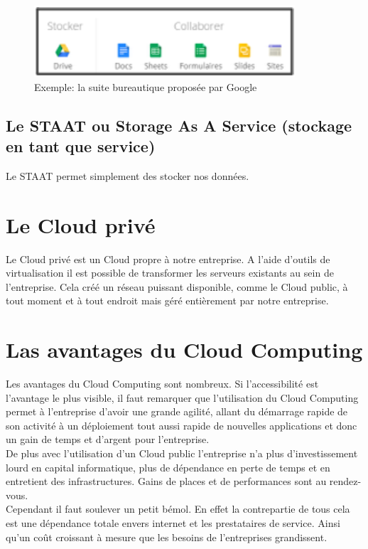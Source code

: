     \begin{figure}
      \begin{center}
        \includegraphics[scale=1]{images/googleDrive.png}
      \end{center}
      \caption{Exemple: la suite bureautique proposée par Google}
      \label{Google Cloud}
    \end{figure}

    \subsection{Le STAAT ou Storage As A Service (stockage en tant que service)}
    Le STAAT permet simplement des stocker nos données.

  \section{Le Cloud privé}
  Le Cloud privé est un Cloud propre à notre entreprise. A l’aide d’outils de virtualisation il est possible de transformer les serveurs existants au sein de l’entreprise. Cela créé un réseau puissant disponible, comme le Cloud public, à tout moment et à tout endroit mais géré entièrement par notre entreprise.

  \section{Las avantages du Cloud Computing}
  Les avantages du Cloud Computing sont nombreux. Si l’accessibilité est l’avantage le plus visible, il faut remarquer que l’utilisation du Cloud Computing permet à l’entreprise d’avoir une grande agilité, allant du démarrage rapide de son activité à un déploiement tout aussi rapide de nouvelles applications et donc un gain de temps et d’argent pour l’entreprise.\\

  De plus avec l’utilisation d’un Cloud public l’entreprise n’a plus d’investissement lourd en capital informatique, plus de dépendance en perte de temps et en entretient des infrastructures. Gains de places et de performances sont au rendez-vous.\\

  Cependant il faut soulever un petit bémol. En effet la contrepartie de tous cela est une dépendance totale envers internet et les prestataires de service. Ainsi qu’un coût croissant à mesure que les besoins de l’entreprises grandissent.


